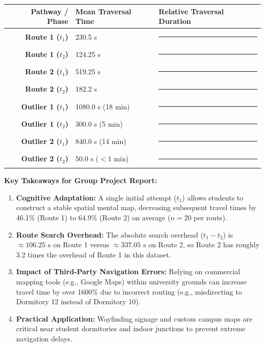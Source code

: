 \documentclass[11pt, a4paper]{article}
\begin{document}
\begin{center}
\small
\begin{tabular}{r l l}
\toprule
\textbf{Pathway / Phase} & \textbf{Mean Traversal Time} & \textbf{Relative Traversal Duration} \\
\midrule
\textbf{Route 1 ($t_1$)} & 230.5 s & \textcolor{primary}{\rule{1.6cm}{8pt}} \\
\textbf{Route 1 ($t_2$)} & 124.25 s & \textcolor{secondary}{\rule{0.9cm}{8pt}} \\[0.4em]
\textbf{Route 2 ($t_1$)} & 519.25 s & \textcolor{primary}{\rule{3.6cm}{8pt}} \\
\textbf{Route 2 ($t_2$)} & 182.2 s & \textcolor{secondary}{\rule{1.3cm}{8pt}} \\[0.4em]
\textbf{Outlier 1 ($t_1$)} & 1080.0 s (18 min) & \textcolor{accent}{\rule{7.5cm}{8pt}} \\
\textbf{Outlier 1 ($t_2$)} & 300.0 s (5 min) & \textcolor{secondary}{\rule{2.1cm}{8pt}} \\[0.4em]
\textbf{Outlier 2 ($t_1$)} & 840.0 s (14 min) & \textcolor{accent}{\rule{5.8cm}{8pt}} \\
\textbf{Outlier 2 ($t_2$)} & 50.0 s ($<1$ min) & \textcolor{secondary}{\rule{0.3cm}{8pt}} \\
\bottomrule
\end{tabular}
\end{center}

\vspace{1.5em}

\begin{tcolorbox}[colframe=primary, title=Project Integration Summary]
\textbf{Key Takeaways for Group Project Report:}
\begin{enumerate}
    \item \textbf{Cognitive Adaptation:} A single initial attempt ($t_1$) allows students to construct a stable spatial mental map, decreasing subsequent travel times by 46.1\% (Route 1) to 64.9\% (Route 2) on average ($n=20$ per route).
    \item \textbf{Route Search Overhead:} The absolute search overhead ($t_1 - t_2$) is $\approx 106.25\text{ s}$ on Route 1 versus $\approx 337.05\text{ s}$ on Route 2, so Route 2 has roughly 3.2 times the overhead of Route 1 in this dataset.
    \item \textbf{Impact of Third-Party Navigation Errors:} Relying on commercial mapping tools (e.g., Google Maps) within university grounds can increase travel time by over 1600\% due to incorrect routing (e.g., misdirecting to Dormitory 12 instead of Dormitory 10).
    \item \textbf{Practical Application:} Wayfinding signage and custom campus maps are critical near student dormitories and indoor junctions to prevent extreme navigation delays.
\end{enumerate}
\end{tcolorbox}
\end{document}
